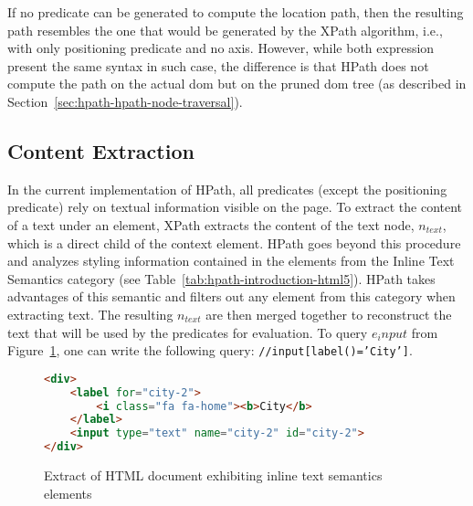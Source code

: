 If no predicate can be generated to compute the location path, then the resulting path resembles the one that would be generated by the XPath algorithm, i.e., with only positioning predicate and no axis. However, while both expression present the same syntax in such case, the difference is that HPath does not compute the path on the actual \gls{dom} but on the pruned \gls{dom} tree (as described in Section~\ref{sec:hpath-hpath-node-traversal}).

\subsection{Content Extraction}
\label{sec:hpath-hpath-text-extraction}

In the current implementation of HPath, all predicates (except the positioning predicate) rely on textual information visible on the page. To extract the content of a text under an element, XPath extracts the content of the text node, $n_{text}$, which is a direct child of the context element. HPath goes beyond this procedure and analyzes styling information contained in the elements from the Inline Text Semantics category (see Table~\ref{tab:hpath-introduction-html5}). HPath takes advantages of this semantic and filters out any element from this category when extracting text. The resulting $n_{text}$ are then merged together to reconstruct the text that will be used by the predicates for evaluation. To query $e_input$ from Figure~\ref{fig:html-document-text}, one can write the following query: \texttt{//input[label()='City']}.

\begin{figure}[h!]
\centering
\caption{Extract of HTML document exhibiting inline text semantics elements}
\label{fig:html-document-text}
\begin{minipage}{0.8\linewidth}
\begin{lstlisting}[language=HTML]
<div>
    <label for="city-2">
        <i class="fa fa-home"><b>City</b>
    </label>
    <input type="text" name="city-2" id="city-2">
</div>
\end{lstlisting}
\end{minipage}
\end{figure}